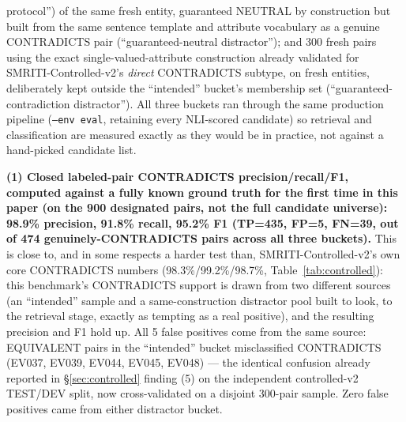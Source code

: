 protocol'') of the same fresh entity, guaranteed NEUTRAL by construction
but built from the same sentence template and attribute vocabulary as a
genuine CONTRADICTS pair (``guaranteed-neutral distractor''); and 300
fresh pairs using the exact single-valued-attribute construction already
validated for SMRITI-Controlled-v2's \emph{direct} CONTRADICTS subtype,
on fresh entities, deliberately kept outside the ``intended'' bucket's
membership set (``guaranteed-contradiction distractor''). All three
buckets ran through the same production pipeline (\texttt{--env eval},
retaining every NLI-scored candidate) so retrieval and classification
are measured exactly as they would be in practice, not against a
hand-picked candidate list.

\textbf{(1) Closed labeled-pair CONTRADICTS precision/recall/F1, computed
against a fully known ground truth for the first time in this paper (on
the 900 designated pairs, not the full candidate universe): 98.9\%
precision, 91.8\% recall, 95.2\% F1 (TP=435, FP=5, FN=39, out of 474
genuinely-CONTRADICTS pairs across all three buckets).} This is close to,
and in some respects a harder test than, SMRITI-Controlled-v2's own core
CONTRADICTS numbers (98.3\%/99.2\%/98.7\%, Table~\ref{tab:controlled}):
this benchmark's CONTRADICTS support is drawn from two different
sources (an ``intended'' sample and a same-construction distractor pool
built to look, to the retrieval stage, exactly as tempting as a real
positive), and the resulting precision and F1 hold up. All 5 false
positives come from the same source: EQUIVALENT pairs in the
``intended'' bucket misclassified CONTRADICTS (EV037, EV039, EV044,
EV045, EV048) --- the identical confusion already reported in
\S\ref{sec:controlled} finding (5) on the independent controlled-v2 TEST/DEV
split, now cross-validated on a disjoint 300-pair sample. Zero false
positives came from either distractor bucket.

